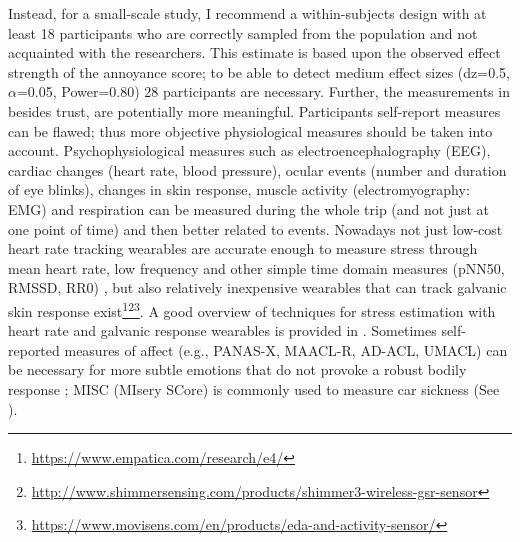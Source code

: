 Instead, for a small-scale study, I recommend a within-subjects design with at least 18 participants who are correctly sampled from the population and not acquainted with the researchers. This estimate is based upon the observed effect strength of the annoyance score; to be able to detect medium effect sizes (dz=0.5, \(\alpha\)=0.05, Power=0.80) 28 participants are necessary. Further, the measurements in \emph{} besides trust, are potentially more meaningful. Participants self-report measures can be flawed; thus more objective physiological measures should be taken into account.  Psychophysiological measures such as electroencephalography (EEG), cardiac changes (heart rate, blood pressure), ocular events (number and duration of eye blinks), changes in skin response, muscle activity (electromyography: EMG) and respiration \cite{Tichon2014PhysiologicalTraining} can be measured during the whole trip (and not just at one point of time) and then better related to events. Nowadays not just low-cost heart rate tracking wearables are accurate enough to measure stress through mean heart rate, low frequency and other simple time domain measures (pNN50, RMSSD, RR0) \cite{Salai2016}, but also relatively inexpensive wearables that can track galvanic skin response exist\footnote{\url{https://www.empatica.com/research/e4/}}\fnsep\footnote{\url{http://www.shimmersensing.com/products/shimmer3-wireless-gsr-sensor}}\fnsep\footnote{\url{https://www.movisens.com/en/products/eda-and-activity-sensor/}}. A good overview of techniques for stress estimation with heart rate and galvanic response wearables is provided in \cite{Ollander2015WearableEstimation}. Sometimes self-reported measures of affect (e.g., PANAS-X, MAACL-R, AD-ACL, UMACL) can be necessary for more subtle emotions that do not provoke a robust bodily response \cite{Boyle2015MeasuresDimensions}; MISC (MIsery SCore) is commonly used to measure car sickness (See \emph{}). %

